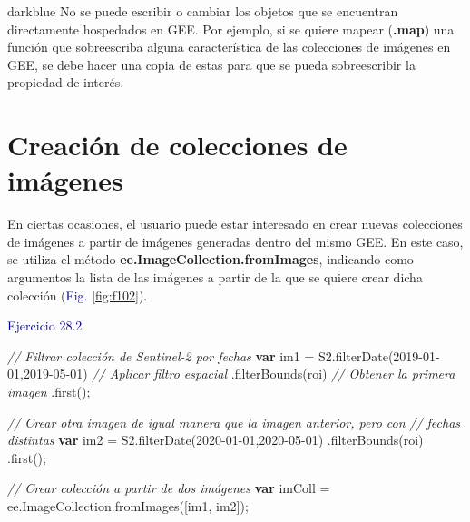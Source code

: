 \documentclass[
  12pt,
  letterpaper,
  twoside]{book}
\newenvironment{Shaded}{\begin{snugshade}}{\end{snugshade}}
\newcommand{\AttributeTok}[1]{\textcolor[rgb]{0.48,0.12,0.64}{#1}}
\newcommand{\CommentTok}[1]{\textcolor[rgb]{0.24,0.58,0.00}{\textit{#1}}}
\newcommand{\FunctionTok}[1]{\textcolor[rgb]{0.48,0.12,0.64}{#1}}
\newcommand{\KeywordTok}[1]{\textcolor[rgb]{0.00,0.00,0.00}{\textbf{#1}}}
\newcommand{\NormalTok}[1]{#1}
\newcommand{\OperatorTok}[1]{\textcolor[rgb]{0.00,0.00,0.00}{#1}}
\newcommand{\StringTok}[1]{\textcolor[rgb]{0.87,0.29,0.22}{#1}}
\newcommand\boldpurple[1]{\textcolor{darkpurple}{\textbf{#1}}}
\begin{document}
\begin{bluebox2}

\begin{awesomeblock}{5pt}{\faLightbulb}{darkblue}
No se puede escribir o cambiar los objetos que se encuentran directamente hospedados en GEE. Por ejemplo, si se quiere mapear (\boldpurple{.map}) una función que sobreescriba alguna característica de las colecciones de imágenes en GEE, se debe hacer una copia de estas para que se pueda sobreescribir la propiedad de interés.

\end{awesomeblock}

\end{bluebox2}

\hypertarget{creaciuxf3n-de-colecciones-de-imuxe1genes}{%
\section{Creación de colecciones de imágenes}\label{creaciuxf3n-de-colecciones-de-imuxe1genes}}

En ciertas ocasiones, el usuario puede estar interesado en crear nuevas colecciones de imágenes a partir de imágenes generadas dentro del mismo GEE. En este caso, se utiliza el método \boldpurple{ee.ImageCollection.fromImages}, indicando como argumentos la lista de las imágenes a partir de la que se quiere crear dicha colección (\textcolor{darkblue}{Fig.} \ref{fig:f102}).

\textcolor{darkblue}{Ejercicio 28.2}

\begin{Shaded}
\begin{Highlighting}[]
\CommentTok{// Filtrar colección de Sentinel{-}2 por fechas}
\KeywordTok{var}\NormalTok{ im1 }\OperatorTok{=}\NormalTok{ S2}\OperatorTok{.}\FunctionTok{filterDate}\NormalTok{(}\StringTok{\textquotesingle{}2019{-}01{-}01\textquotesingle{}}\OperatorTok{,}\StringTok{\textquotesingle{}2019{-}05{-}01\textquotesingle{}}\NormalTok{)}
  \CommentTok{// Aplicar filtro espacial}
 \OperatorTok{.}\FunctionTok{filterBounds}\NormalTok{(roi)}
 \CommentTok{// Obtener la primera imagen}
 \OperatorTok{.}\FunctionTok{first}\NormalTok{()}\OperatorTok{;}

\CommentTok{// Crear otra imagen de igual manera que la imagen anterior, pero con }
\CommentTok{// fechas distintas}
\KeywordTok{var}\NormalTok{ im2 }\OperatorTok{=}\NormalTok{ S2}\OperatorTok{.}\FunctionTok{filterDate}\NormalTok{(}\StringTok{\textquotesingle{}2020{-}01{-}01\textquotesingle{}}\OperatorTok{,}\StringTok{\textquotesingle{}2020{-}05{-}01\textquotesingle{}}\NormalTok{)}
 \OperatorTok{.}\FunctionTok{filterBounds}\NormalTok{(roi)}
 \OperatorTok{.}\FunctionTok{first}\NormalTok{()}\OperatorTok{;}

\CommentTok{// Crear colección a partir de dos imágenes}
\KeywordTok{var}\NormalTok{ imColl }\OperatorTok{=}\NormalTok{ ee}\OperatorTok{.}\AttributeTok{ImageCollection}\OperatorTok{.}\FunctionTok{fromImages}\NormalTok{([im1}\OperatorTok{,}\NormalTok{ im2])}\OperatorTok{;}
\end{Highlighting}
\end{Shaded}
\end{document}
